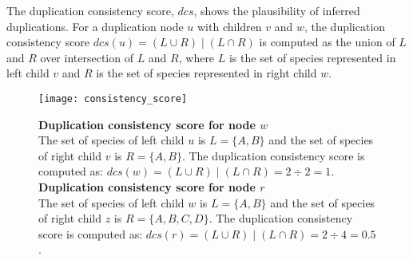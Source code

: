 The duplication consistency score, $dcs$, shows the plausibility of inferred duplications. For a duplication node $u$ with children $v$ and $w$, the duplication consistency score $dcs(u) = (L \cup R) \mid (L \cap R)$ is computed as the union of $L$ and $R$ over intersection of $L$ and $R$, where $L$ is the set of species represented in left child $v$ and $R$ is the set of species represented in right child $w$.

\begin{figure}[ht!]
	\centering
	\label{consistency_score}
  	\texttt{[image: consistency\_score]}
  	\caption[Duplication consistency score]{\textbf{Duplication consistency score for node $w$}\\
  	The set of species of left child $u$ is $L = \{A, B\}$ and the set of species of right child $v$ is $R = \{A, B\}$. The duplication consistency score is computed as: $dcs(w) = (L \cup R) \mid (L \cap R) = 2 \div 2 = 1$.
  	\\
  	\textbf{Duplication consistency score for node $r$}\\
  	The set of species of left child $w$ is $L = \{A, B\}$ and the set of species of right child $z$ is $R = \{A, B, C, D\}$. The duplication consistency score is computed as: $dcs(r) = (L \cup R) \mid (L \cap R) = 2 \div 4 = 0.5$.}
\end{figure}

